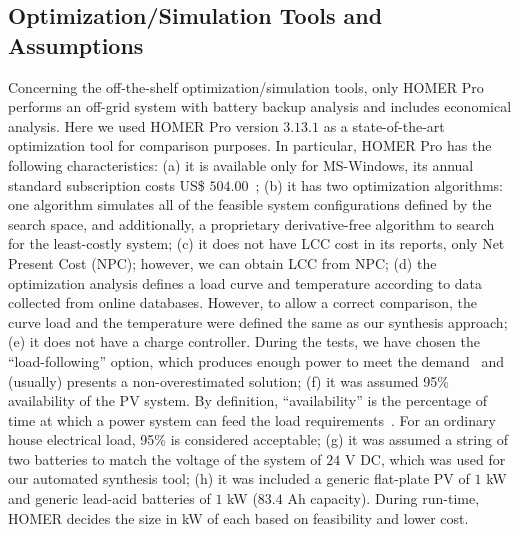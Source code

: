 \documentclass[runningheads]{llncs}
\begin{document}
\subsection{Optimization/Simulation Tools and Assumptions}
Concerning the off-the-shelf optimization/simulation tools, only HOMER Pro performs an off-grid system with battery backup analysis and includes economical analysis. Here we used HOMER Pro version $3.13.1$ as a state-of-the-art optimization tool for comparison purposes. In particular, HOMER Pro has the following characteristics:
(a) it is available only for MS-Windows, its annual standard subscription costs US\$ $504.00$~\cite{HOMER}; 
(b) it has two optimization algorithms: one algorithm simulates all of the feasible system configurations defined by the search space, and additionally, a proprietary derivative-free algorithm to search for the least-costly system;
(c) it does not have LCC cost in its reports, only Net Present Cost (NPC); however, we can obtain LCC from NPC; 
(d) the optimization analysis defines a load curve and temperature according to data collected from online databases. However, to allow a correct comparison, the curve load and the temperature were defined the same as our synthesis approach; 
(e) it does not have a charge controller. During the tests, we have chosen the ``load-following'' option, which produces enough power to meet the demand~\cite{HOMER} and (usually) presents a non-overestimated solution; 
(f) it was assumed 95\% availability of the PV system. By definition, ``availability'' is the percentage of time at which a power system can feed the load requirements~\cite{Khatib2014}. For an ordinary house electrical load, 95\% is considered acceptable;
(g) it was assumed a string of two batteries to match the voltage of the system of $24$ V DC, which was used for our automated synthesis tool; 
(h) it was included a generic flat-plate PV of $1$ kW and generic lead-acid batteries of $1$ kW ($83.4$ Ah capacity). During run-time, HOMER decides the size in kW of each based on feasibility and lower cost.
\end{document}
